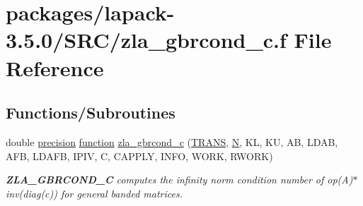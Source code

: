 \hypertarget{zla__gbrcond__c_8f}{}\section{packages/lapack-\/3.5.0/\+S\+R\+C/zla\+\_\+gbrcond\+\_\+c.f File Reference}
\label{zla__gbrcond__c_8f}
\subsection*{Functions/\+Subroutines}
\begin{DoxyCompactItemize}
\item 
double \hyperlink{numinquire_8h_a2c8e616467665d0b2814d4c1589ba74e}{precision} \hyperlink{afunc_8m_a7b5e596df91eadea6c537c0825e894a7}{function} \hyperlink{group__complex16GBcomputational_ga70ef3ec53bb3d6704ccf2f9d0add0eda}{zla\+\_\+gbrcond\+\_\+c} (\hyperlink{superlu__enum__consts_8h_a0c4e17b2d5cea33f9991ccc6a6678d62a1f61e3015bfe0f0c2c3fda4c5a0cdf58}{T\+R\+A\+N\+S}, \hyperlink{polmisc_8c_a0240ac851181b84ac374872dc5434ee4}{N}, K\+L, K\+U, A\+B, L\+D\+A\+B, A\+F\+B, L\+D\+A\+F\+B, I\+P\+I\+V, C, C\+A\+P\+P\+L\+Y, I\+N\+F\+O, W\+O\+R\+K, R\+W\+O\+R\+K)
\begin{DoxyCompactList}\small\item\em {\bfseries Z\+L\+A\+\_\+\+G\+B\+R\+C\+O\+N\+D\+\_\+\+C} computes the infinity norm condition number of op(\+A)$\ast$inv(diag(c)) for general banded matrices. \end{DoxyCompactList}\end{DoxyCompactItemize}
